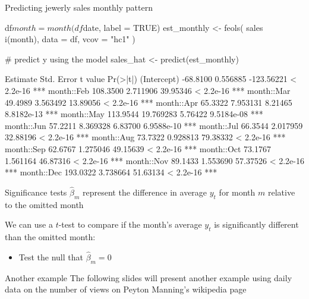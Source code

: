 \documentclass[aspectratio=169,t,11pt,table]{beamer}
\begin{document}

\begin{frame}[fragile]{Predicting jewerly sales monthly pattern}
  \begin{codeblock}
df$month = month(df$date, label = TRUE)
est_monthly <- feols(
  sales ~ i(month), data = df, vcov = "hc1"
)

# predict y using the model
sales_hat <- predict(est_monthly)
  \end{codeblock}
\end{frame}

\begin{frame}[fragile]
  \begin{codeblock}
            Estimate Std. Error    t value   Pr(>|t|)    
(Intercept) -68.8100   0.556885 -123.56221  < 2.2e-16 ***
month::Feb  108.3500   2.711906   39.95346  < 2.2e-16 ***
month::Mar   49.4989   3.563492   13.89056  < 2.2e-16 ***
month::Apr   65.3322   7.953131    8.21465 8.8182e-13 ***
month::May  113.9544  19.769283    5.76422 9.5184e-08 ***
month::Jun   57.2211   8.369328    6.83700 6.9588e-10 ***
month::Jul   66.3544   2.017959   32.88196  < 2.2e-16 ***
month::Aug   73.7322   0.928813   79.38332  < 2.2e-16 ***
month::Sep   62.6767   1.275046   49.15639  < 2.2e-16 ***
month::Oct   73.1767   1.561164   46.87316  < 2.2e-16 ***
month::Nov   89.1433   1.553690   57.37526  < 2.2e-16 ***
month::Dec  193.0322   3.738664   51.63134  < 2.2e-16 ***
  \end{codeblock}
\end{frame}


\begin{frame}{Significance tests}
  $\hat{\beta}_m$ represent the difference in average $y_t$ for month $m$ relative to the omitted month 

  \bigskip
  We can use a $t$-test to compare if the month's average $y_t$ is significantly different than the omitted month:
  \begin{itemize}
    \item Test the null that $\hat{\beta}_m = 0$
  \end{itemize}
\end{frame}

\begin{frame}{Another example}
  The following slides will present another example using daily data on the number of views on Peyton Manning's wikipedia page
\end{frame}
\end{document}

